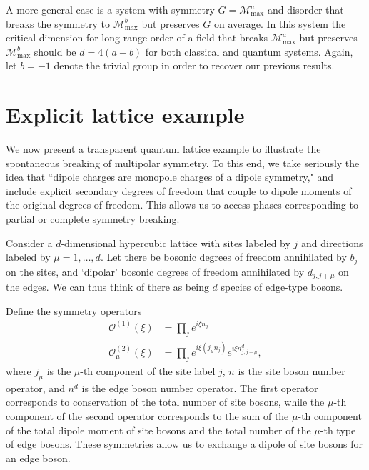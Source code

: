 \documentclass[pra,aps,twocolumn, amsfonts,amsmath,amssymb,nofootinbib,superscriptaddress]{revtex4-2}
\newcommand{\todo}[1]{\textcolor{orange}{#1}}
\newcommand{\op}[1]{\mathcal{O}^{(#1)}}
\newcommand{\nn}{\nonumber\\}
\renewcommand{\max}{\text{max}}
\newcommand{\mmax}[1]{\mathcal{M}^{#1}_\max}
\begin{document}
A more general case is a system with symmetry $G = \mathcal{M}_\max^a$ and disorder that breaks the symmetry to $\mathcal{M}_\max^b$ but preserves $G$ on average. In this system the critical dimension for long-range order of a field that breaks $\mmax{a}$ but preserves $\mmax{b}$ should be $d=4(a-b)$ for both classical and quantum systems. Again, let $b=-1$ denote the trivial group in order to recover our previous results.


\section{Explicit lattice example} \label{sec:example}

We now present a transparent quantum lattice example to illustrate the spontaneous breaking of multipolar symmetry. To this end, we take seriously the idea that ``dipole charges are monopole charges of a dipole symmetry," and include explicit secondary degrees of freedom that couple to dipole moments of the original degrees of freedom. This allows us to access phases corresponding to partial or complete symmetry breaking. 

Consider a $d$-dimensional hypercubic lattice with sites labeled by $j$ and directions labeled by $\mu = 1,\dots,d$. Let there be bosonic degrees of freedom annihilated by $b_j$ on the sites, and `dipolar' bosonic degrees of freedom annihilated by $d_{j,j+\mu}$ on the edges. We can thus think of there as being $d$ species of edge-type bosons.

Define the symmetry operators
\begin{align}
\op{1}(\xi) &= \prod_je^{i\xi n_j}\nn
\op{2}_\mu(\xi) &= \prod_j e^{i\xi (j_\mu n_j)}e^{i\xi n^d_{j,j+\mu}},
\end{align}
where $j_\mu$ is the $\mu$-th component of the site label $j$, $n$ is the site boson number operator, and $n^d$ is the edge boson number operator.
The first operator corresponds to conservation of the total number of site bosons, while the $\mu$-th component of the second operator corresponds to the sum of the $\mu$-th component of the total dipole moment of site bosons and the total number of the $\mu$-th type of edge bosons. These symmetries allow us to exchange a dipole of site bosons for an edge boson. 
\end{document}
